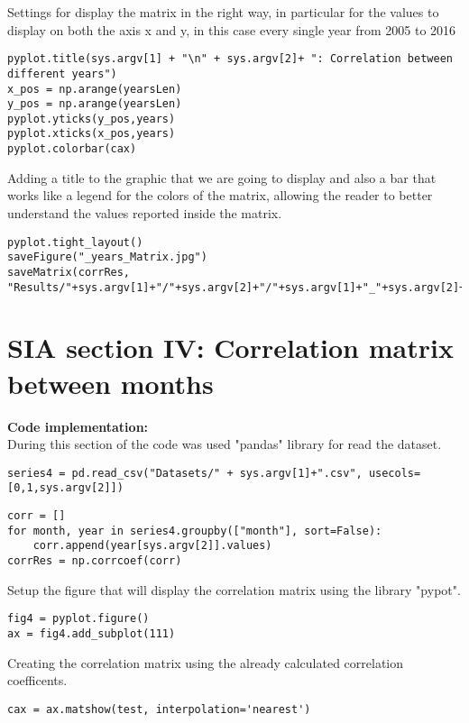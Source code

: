 Settings for display the matrix in the right way, in particular for the values to display on both the axis x and y, in this case every single year from 2005 to 2016
\begin{lstlisting}
pyplot.title(sys.argv[1] + "\n" + sys.argv[2]+ ": Correlation between different years")
x_pos = np.arange(yearsLen)
y_pos = np.arange(yearsLen)
pyplot.yticks(y_pos,years)
pyplot.xticks(x_pos,years)
pyplot.colorbar(cax)
\end{lstlisting}
\newpage
Adding a title to the graphic that we are going to display and also a bar that works like a legend for the colors of the matrix, allowing the reader to better understand the values reported inside the matrix.
\begin{lstlisting}
pyplot.tight_layout()
saveFigure("_years_Matrix.jpg")
saveMatrix(corrRes, "Results/"+sys.argv[1]+"/"+sys.argv[2]+"/"+sys.argv[1]+"_"+sys.argv[2]+"_years_CorrCoeff.csv")

\end{lstlisting}


\section{SIA section IV: Correlation matrix between months}
\label{SIA_section_IV}
\textbf{Code implementation:}\\
During this section of the code was used "pandas" library for read the dataset.
\begin{lstlisting}
series4 = pd.read_csv("Datasets/" + sys.argv[1]+".csv", usecols=[0,1,sys.argv[2]])
\end{lstlisting}

\begin{lstlisting}
corr = []
for month, year in series4.groupby(["month"], sort=False):
	corr.append(year[sys.argv[2]].values)
corrRes = np.corrcoef(corr)
\end{lstlisting}

Setup the figure that will display the correlation matrix using the library "pypot".
\begin{lstlisting}
fig4 = pyplot.figure()
ax = fig4.add_subplot(111)
\end{lstlisting}

Creating the correlation matrix using the already calculated correlation coefficents.
\begin{lstlisting}
cax = ax.matshow(test, interpolation='nearest')
\end{lstlisting}

